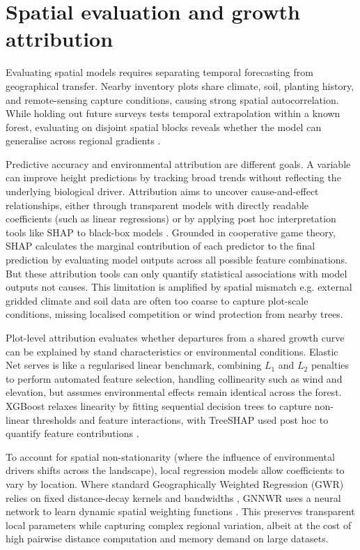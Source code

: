 \section{Spatial evaluation and growth attribution}
\label{sec:background-spatial-attribution}

Evaluating spatial models requires separating temporal forecasting from geographical transfer. Nearby inventory plots share climate, soil, planting history, and remote-sensing capture conditions, causing strong spatial autocorrelation. While holding out future surveys tests temporal extrapolation within a known forest, evaluating on disjoint spatial blocks reveals whether the model can generalise across regional gradients \cite{ploton2020Spatial_C5_EVAL}.

Predictive accuracy and environmental attribution are different goals. A variable can improve height predictions by tracking broad trends without reflecting the underlying biological driver. Attribution aims to uncover cause-and-effect relationships, either through transparent models with directly readable coefficients (such as linear regressions) or by applying post hoc interpretation tools like SHAP to black-box models \citep{lundberg2017Unified_C7_XAI}. Grounded in cooperative game theory, SHAP calculates the marginal contribution of each predictor to the final prediction by evaluating model outputs across all possible feature combinations. But these attribution tools can only quantify statistical associations with model outputs not causes. This limitation is amplified by spatial mismatch e.g. external gridded climate and soil data are often too coarse to capture plot-scale conditions, missing localised competition or wind protection from nearby trees. 

Plot-level attribution evaluates whether departures from a shared growth curve can be explained by stand characteristics or environmental conditions. Elastic Net serves is like a regularised linear benchmark, combining $L_1$ and $L_2$ penalties to perform automated feature selection, handling collinearity such as wind and elevation, but assumes environmental effects remain identical across the forest. 
XGBoost relaxes linearity by fitting sequential decision trees to capture non-linear thresholds and feature interactions, with TreeSHAP used post hoc to quantify feature contributions \citep{lundberg2017Unified_C7_XAI}.

To account for spatial non-stationarity (where the influence of environmental drivers shifts across the landscape), local regression models allow coefficients to vary by location. Where standard Geographically Weighted Regression (GWR) relies on fixed distance-decay kernels and bandwidths \citep{brunsdon1996Geographically_C6_GWR}, GNNWR uses a neural network to learn dynamic spatial weighting functions \citep{du2020Geographically_C6_GWR}. This preserves transparent local parameters while capturing complex regional variation, albeit at the cost of high pairwise distance computation and memory demand on large datasets.

